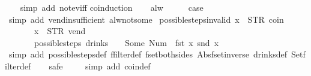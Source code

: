 \begin{isabellebody}
%
\isadelimproof
\ \ %
\endisadelimproof
%
\isatagproof
{}\isamarkupfalse%
\ {\isacharparenleft}simp\ add{\isacharcolon}\ not{\isacharunderscore}ev{\isacharunderscore}iff{\isacharparenright}\isanewline
{}\isamarkupfalse%
{\isacharparenleft}coinduction{\isacharparenright}\isanewline
\ \ \isamarkupfalse%
\ alw\isanewline
\ \ \isamarkupfalse%
\ \isamarkupfalse%
\ {\isacharquery}case\isanewline
\ \ \ \ \isamarkupfalse%
\ {\isacharparenleft}simp\ add{\isacharcolon}\ vend{\isacharunderscore}insufficient\ alw{\isacharunderscore}not{\isacharunderscore}some{\isacharparenright}\isanewline
{}\isamarkupfalse%
%
\endisatagproof
{\isafoldproof}%
%
\isadelimproof
\isanewline
%
\endisadelimproof
\isanewline
{}\isamarkupfalse%
\ possible{\isacharunderscore}steps{\isacharunderscore}{}{\isacharunderscore}invalid{\isacharcolon}\ {\isachardoublequoteopen}x{}\ {\isasymnoteq}\ {\isacharparenleft}STR\ {\isacharprime}{\isacharprime}coin{\isacharprime}{\isacharprime}{\isacharcomma}\ {\isacharbrackleft}{\isacharbrackright}{\isacharparenright}\ {\isasymLongrightarrow}\isanewline
\ \ \ \ \ \ \ x{}\ {\isasymnoteq}\ {\isacharparenleft}STR\ {\isacharprime}{\isacharprime}vend{\isacharprime}{\isacharprime}{\isacharcomma}\ {\isacharbrackleft}{\isacharbrackright}{\isacharparenright}\ {\isasymLongrightarrow}\isanewline
\ \ \ \ \ \ \ possible{\isacharunderscore}steps\ drinks\ {}\ {\isacharless}{}\ {\isachardollar}{\isacharcolon}{\isacharequal}\ Some\ {\isacharparenleft}Num\ {}{\isacharparenright}{\isachargreater}\ {\isacharparenleft}fst\ x{}{\isacharparenright}\ {\isacharparenleft}snd\ x{}{\isacharparenright}\ {\isacharequal}\ {\isacharbraceleft}{\isacharbar}{\isacharbar}{\isacharbraceright}{\isachardoublequoteclose}\isanewline
%
\isadelimproof
\ \ %
\endisadelimproof
%
\isatagproof
{}\isamarkupfalse%
\ {\isacharparenleft}simp\ add{\isacharcolon}\ possible{\isacharunderscore}steps{\isacharunderscore}def\ ffilter{\isacharunderscore}def\ fset{\isacharunderscore}both{\isacharunderscore}sides\ Abs{\isacharunderscore}fset{\isacharunderscore}inverse\ drinks{\isacharunderscore}def\ Set{\isachardot}filter{\isacharunderscore}def{\isacharparenright}\isanewline
\ \ \isamarkupfalse%
\ safe\isanewline
\ \ \ \isamarkupfalse%
\ {\isacharparenleft}simp\ add{\isacharcolon}\ coin{\isacharunderscore}def{\isacharparenright}\isanewline
\ \ \ \isamarkupfalse%

\end{isabellebody}
